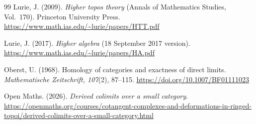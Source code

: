 \documentclass[11pt,a4paper]{article}
\theoremstyle{definition}
\begin{document}
\begin{thebibliography}{99}
Lurie, J. (2009). \emph{Higher topos theory}
(Annals of Mathematics Studies, Vol.~170). Princeton University Press.
\url{https://www.math.ias.edu/~lurie/papers/HTT.pdf}
\par{}

Lurie, J. (2017). \emph{Higher algebra} (18 September 2017 version).
\url{https://www.math.ias.edu/~lurie/papers/HA.pdf}
\par{}

Oberst, U. (1968).
Homology of categories and exactness of direct limits.
\emph{Mathematische Zeitschrift, 107}(2), 87--115.
\url{https://doi.org/10.1007/BF01111023}
\par{}

Open Maths. (2026). \emph{Derived colimits over a small category}.
\url{https://openmaths.org/courses/cotangent-complexes-and-deformations-in-ringed-topoi/derived-colimits-over-a-small-category.html}
\par{}
\end{thebibliography}
\end{document}
